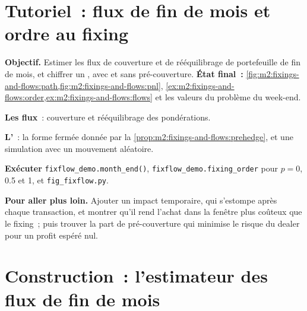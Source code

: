 \section{Tutoriel~: flux de fin de mois et ordre au fixing}\label{tut:m2:fixings-and-flows:flows}

\begin{tutorial}
\textbf{Objectif.} Estimer les flux de couverture et de rééquilibrage de portefeuille de fin de mois, et
chiffrer un , avec et sans pré-couverture. \textbf{État final~:}
\cref{fig:m2:fixings-and-flows:path,fig:m2:fixings-and-flows:pnl},
\cref{ex:m2:fixings-and-flows:order,ex:m2:fixings-and-flows:flows} et les
valeurs du problème du week-end.
\begin{tutsteps}
\item \textbf{Les flux}~: couverture et rééquilibrage des pondérations.
\label{lst:m2:fixings-and-flows:flows}
\item \textbf{L'}~: la forme fermée donnée par
la \cref{prop:m2:fixings-and-flows:prehedge}, et une simulation avec un mouvement aléatoire.
\label{lst:m2:fixings-and-flows:fix}
\item \textbf{Exécuter} \texttt{fixflow\_demo.month\_end()},
\texttt{fixflow\_demo.fixing\_order} pour $p = 0$, 0.5 et 1, et
\texttt{fig\_fixflow.py}.
\end{tutsteps}
\textbf{Pour aller plus loin.} Ajouter un impact temporaire, qui s'estompe après chaque
transaction, et montrer qu'il rend l'achat dans la fenêtre plus coûteux que le fixing~;
puis trouver la part de pré-couverture qui minimise le risque du dealer
pour un profit espéré nul.
\end{tutorial}

\section{Construction~: l'estimateur des flux de fin de mois}\label{bld:m2:fixings-and-flows:fixflow}

